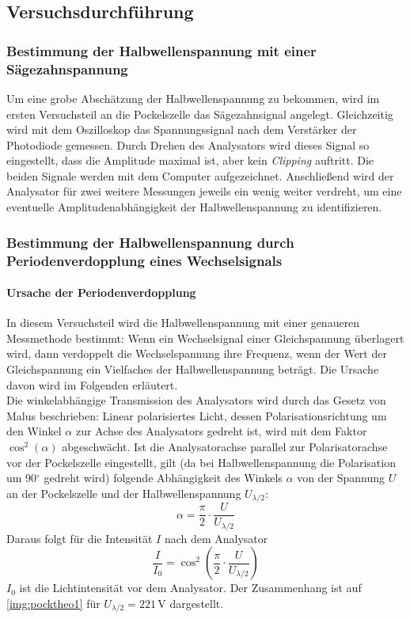 \subsection{Versuchsdurchführung}
\subsubsection{Bestimmung der Halbwellenspannung mit einer Sägezahnspannung}
Um eine grobe Abschätzung der Halbwellenspannung zu bekommen,
wird im ersten Versuchsteil an die Pockelszelle das Sägezahnsignal angelegt.
Gleichzeitig wird mit dem Oszilloskop das Spannungssignal nach dem Verstärker der Photodiode gemessen.
Durch Drehen des Analysators wird dieses Signal so eingestellt,
dass die Amplitude maximal ist, aber kein \emph{Clipping} auftritt.
Die beiden Signale werden mit dem Computer aufgezeichnet.
Anschließend wird der Analysator für zwei weitere Messungen jeweils ein wenig weiter verdreht,
um eine eventuelle Amplitudenabhängigkeit der Halbwellenspannung zu identifizieren. 


\subsubsection{Bestimmung der Halbwellenspannung durch Periodenverdopplung eines Wechselsignals}

\paragraph{Ursache der Periodenverdopplung}
In diesem Versuchsteil wird die Halbwellenspannung mit einer genaueren Messmethode bestimmt:
Wenn ein Wechselsignal einer Gleichspannung überlagert wird,
dann verdoppelt die Wechselspannung ihre Frequenz,
wenn der Wert der Gleichspannung ein Vielfaches der Halbwellenspannung beträgt.
Die Ursache davon wird im Folgenden erläutert.\\
Die winkelabhängige Transmission des Analysators wird durch das Gesetz von Malus beschrieben:
Linear polarisiertes Licht, dessen Polarisationsrichtung um den Winkel $\alpha$ zur Achse des Analysators
gedreht ist, wird mit dem Faktor $\cos^2(\alpha)$ abgeschwächt.
Ist die Analysatorachse parallel zur Polarisatorachse vor der Pockelszelle eingestellt,
gilt (da bei Halbwellenspannung die Polarisation um 90$^\circ$ gedreht wird)
folgende Abhängigkeit des Winkels $\alpha$ von der Spannung $U$ an der Pockelszelle
und der Halbwellenspannung $U_{\lambda / 2}$:
\begin{equation}
\label{}
  \alpha = \frac{\pi}{2} \cdot \frac{U}{U_{\lambda / 2}}
\end{equation}
Daraus folgt für die Intensität $I$ nach dem Analysator
\begin{equation}
\label{eq:int}
  \frac{I}{I_0}=\cos^2(\frac{\pi}{2} \cdot \frac{U}{U_{\lambda / 2}})
\end{equation}
$I_0$ ist die Lichtintensität vor dem Analysator. Der Zusammenhang ist auf \autoref{img:pocktheo1}
für $U_{\lambda / 2}=221\,$V dargestellt.

